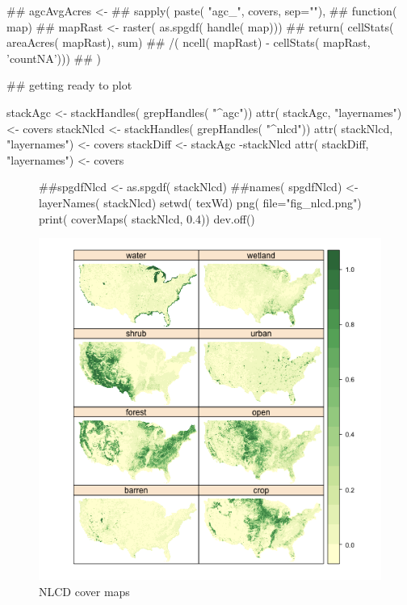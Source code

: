 \begin{Schunk}
\begin{Sinput}
 ## agcAvgAcres <-
 ##   sapply( paste( "agc_", covers, sep=""),
 ##          function( map) {
 ##            mapRast <- raster( as.spgdf( handle( map)))
 ##            return( cellStats( areaAcres( mapRast), sum)
 ##                   /( ncell( mapRast) - cellStats( mapRast, 'countNA')))
 ##          })
 
 
 ## getting ready to plot
 
 stackAgc <- stackHandles( grepHandles(  "^agc"))
 attr( stackAgc, "layernames") <-  covers
 stackNlcd <- stackHandles( grepHandles( "^nlcd"))
 attr( stackNlcd, "layernames") <-  covers
 stackDiff <- stackAgc -stackNlcd
 attr( stackDiff, "layernames") <-  covers
 
\end{Sinput}
\end{Schunk}

\begin{figure} 
\begin{center} 

\begin{Schunk}
\begin{Sinput}
 ##spgdfNlcd <- as.spgdf( stackNlcd)
 ##names( spgdfNlcd) <- layerNames( stackNlcd)
 setwd( texWd)
 png( file="fig_nlcd.png")
 print( coverMaps( stackNlcd, 0.4))
 dev.off()
\end{Sinput}
\end{Schunk}

\includegraphics{fig_nlcd}
\end{center} 
\caption{NLCD cover maps} 
\label{fig:nlcd} 
\end{figure} 

